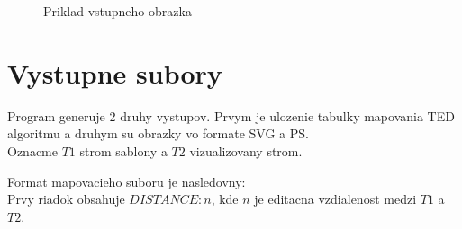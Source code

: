 \begin{figure}
  \caption{Priklad vstupneho obrazka}
  \label{obr:mouse_ps}
\end{figure}

\section{Vystupne subory}

Program generuje 2 druhy vystupov. Prvym je ulozenie tabulky mapovania TED algoritmu a druhym su obrazky
vo formate SVG a PS. \\

Oznacme $T1$ strom sablony a $T2$ vizualizovany strom.

Format mapovacieho suboru je nasledovny: \\
Prvy riadok obsahuje $DISTANCE: n$, kde $n$ je
editacna vzdialenost medzi $T1$ a $T2$.

